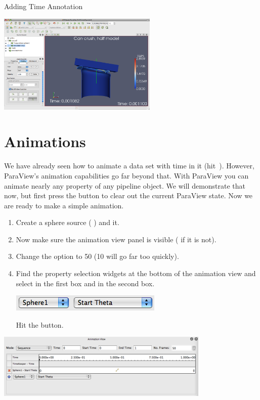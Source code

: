 \begin{exercise}{Adding Time Annotation}
  \begin{inlinefig}
    \includegraphics[width=3in]{images/AnnotateTimeFilter}
  \end{inlinefig}
\end{exercise}


\section{Animations}

We have already seen how to animate a data set with time in it
(hit~\vcrPlay).  However, ParaView’s animation capabilities go far beyond
that.  With ParaView you can animate nearly any property of any pipeline
object.  We will demonstrate that now, but first press the \disconnect
button to clear out the current ParaView state.  Now we are ready to make a
simple animation.

\begin{enumerate}
\item Create a sphere source ( \ra {}) and \apply it.
\item Now make sure the animation view panel is visible ( \ra
   if it is not).
\item Change the  option to 50 (10 will go far too quickly).
\item Find the property selection widgets at the bottom of the animation
  view and select  in the first box and  in
  the second box.
  \begin{inlinefig}
    \includegraphics[height=1.5\baselineskip]{images/AddStartThetaTrack}
  \end{inlinefig}
  Hit the  button.
  \savecounter
\end{enumerate}

\begin{inlinefig}
  \includegraphics[width=4in]{images/BuildAnimation1}
\end{inlinefig}

